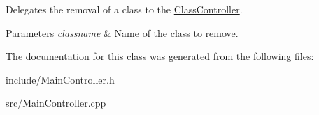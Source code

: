 Delegates the removal of a class to the \hyperlink{classClassController}{Class\+Controller}. 


\begin{DoxyParams}{Parameters}
{\em classname} & Name of the class to remove. \\
\hline
\end{DoxyParams}


The documentation for this class was generated from the following files\+:\begin{DoxyCompactItemize}
\item 
include/Main\+Controller.\+h\item 
src/Main\+Controller.\+cpp\end{DoxyCompactItemize}
